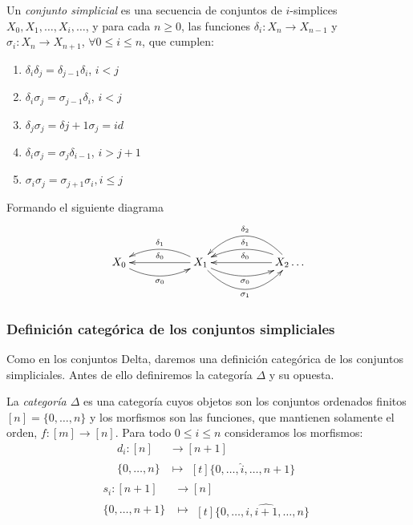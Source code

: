 \documentclass[../main.tex]{subfiles}
\begin{document}
\begin{defi}
    Un \emph{conjunto simplicial} es una secuencia de conjuntos de $i$-simplices $X_0,X_1,\dots,X_i,\dots$, y para cada $n\ge 0$, las funciones $\delta_i: X_n \to X_{n-1}$ y $\sigma_i: X_n \to X_{n+1}$, $\forall 0\le i \le n$, que cumplen:

    \begin{enumerate}[(1)]
        \item $\delta_i\delta_j = \delta_{j-1}\delta_{i}$, $i<j$
        \item $\delta_i\sigma_j = \sigma_{j-1}\delta_{i}$, $i<j$
        \item $\delta_j\sigma_j = \delta{j+1}\sigma_{j} = id$
        \item $\delta_i\sigma_j = \sigma_{j}\delta_{i-1}$, $i>j+1$
        \item $\sigma_i\sigma_j = \sigma_{j+1}\sigma_{i}, i\le j$
    \end{enumerate}
    Formando el siguiente diagrama
    $$
        \xymatrix{
        X_0 \ar@/{}_{1pc}/[rr]_{\sigma_0} & & X_1 \ar@/{}_{1pc}/[rr]_{\sigma_0} \ar@/{}_{2pc}/[rr]_{\sigma_1} \ar@/{}_{1pc}/[ll]_{\delta_1} \ar[ll]_{\delta_0} & & X_2 \ar@/{}_{2pc}/[ll]_{\delta_2} \ar@/{}_{1pc}/[ll]_{\delta_1} \ar[ll]_{\delta_0} \dots
        }
    $$
\end{defi}

\subsubsection{Definici\'on categ\'orica de los conjuntos simpliciales}
Como en los conjuntos Delta, daremos una definici\'on categ\'orica de los conjuntos simpliciales. Antes de ello definiremos la categor\'ia $\Delta$ y su opuesta.
\begin{defi}
    La \emph{categor\'ia $\Delta$} es una categor\'ia cuyos objetos son los conjuntos ordenados finitos $[n] = \{0,\dots,n\}$ y los morfismos son las funciones, que mantienen solamente el orden, $f\colon [m] \to [n]$.
    Para todo $0\le i \le n$ consideramos los morfismos:
    \begin{align*}
        d_i: [n]      & \longrightarrow [n+1] \\
        \{0,\dots,n\} & \longmapsto\!
        \begin{aligned}[t]
            \{0,\dots, \hat{i}, \dots,n+1\}
        \end{aligned}
    \end{align*}
    \begin{align*}
        s_i: [n+1]      & \longrightarrow [n] \\
        \{0,\dots,n+1\} & \longmapsto\!
        \begin{aligned}[t]
            \{0,\dots,i,\widehat{i+1}, \dots,n\}
        \end{aligned}
    \end{align*}
\end{defi}
\end{document}
